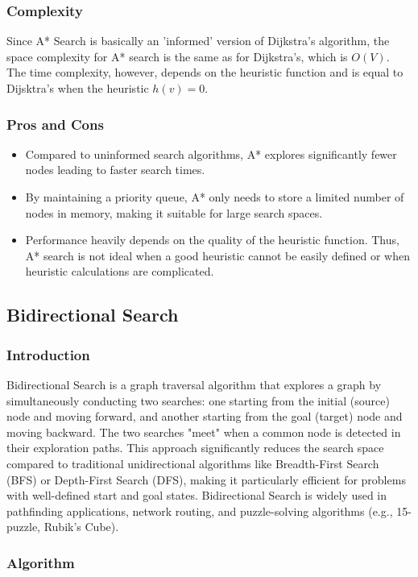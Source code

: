 		\subsubsection{Complexity}
		Since A* Search is basically an 'informed' version of Dijkstra's algorithm, the space complexity for A* search is the same as for Dijkstra's, which is $O(V)$.
		The time complexity, however, depends on the heuristic function and is equal to Dijsktra's when the heuristic $h(v) = 0$.
		\subsubsection{Pros and Cons}
			\begin{itemize}
				\item Compared to uninformed search algorithms, A* explores significantly fewer nodes leading to faster search times. 
				\item By maintaining a priority queue, A* only needs to store a limited number of nodes in memory, making it suitable for large search spaces.
				\item Performance heavily depends on the quality of the heuristic function. Thus, A* search is not ideal when a good heuristic cannot be easily defined or when heuristic calculations are complicated.
			\end{itemize}
	\subsection{Bidirectional Search}
		\subsubsection{Introduction}
			Bidirectional Search is a graph traversal algorithm that explores a graph by simultaneously conducting two searches: one starting from the initial (source) node and moving forward, and another starting from the goal (target) node and moving backward. The two searches "meet" when a common node is detected in their exploration paths. This approach significantly reduces the search space compared to traditional unidirectional algorithms like Breadth-First Search (BFS) or Depth-First Search (DFS), making it particularly efficient for problems with well-defined start and goal states. Bidirectional Search is widely used in pathfinding applications, network routing, and puzzle-solving algorithms (e.g., 15-puzzle, Rubik’s Cube).
		\subsubsection{Algorithm}
		
